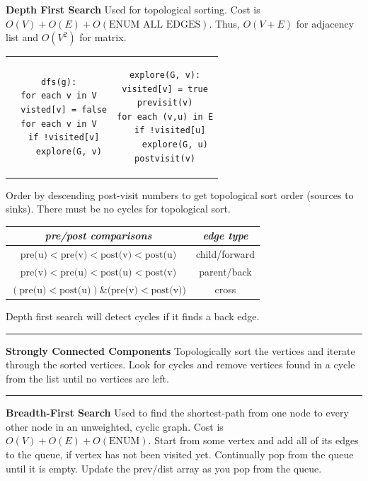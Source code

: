 \documentclass[9pt]{amsart}
\begin{document}
\begin{multicols*}{3}
  \textbf{Depth First Search}
  \newline
  Used for topological sorting. Cost is $O(V) + O(E) + O(\text{ENUM ALL EDGES})$. 
  \newline
  Thus, $O(V + E)$ for adjacency list and $O(V^2)$ for matrix.
  \begin{center}
  \begin{tabular}{c | c}
  \begin{lstlisting}
dfs(g):
for each v in V
  visted[v] = false
for each v in V
  if !visited[v]
    explore(G, v)
  \end{lstlisting}
  &
  \begin{lstlisting}
explore(G, v):
visited[v] = true
previsit(v)
for each (v,u) in E
  if !visited[u]
    explore(G, u)
postvisit(v)
  \end{lstlisting}
  \end{tabular}
  \end{center}
  Order by descending post-visit numbers to get topological sort order (sources to sinks).
  There must be no cycles for topological sort.
  \footnotesize
  \begin{center}
  \begin{tabular}{c | c}
     \emph{pre/post comparisons} & \emph{edge type} \\
     \hline
     $\text{pre(u)} < \text{pre(v)} < \text{post(v)} < \text{post(u)}$ & child/forward \\
     \hline
     $\text{pre(v)} < \text{pre(u)} < \text{post(u)} < \text{post(v)}$ & parent/back \\
     \hline
     $(\text{pre(u)} < \text{post(u)}) \text{\&} (\text{pre(v)} < \text{post(v))}$ & cross \\
  \end{tabular}
  \end{center}
  \normalsize
  Depth first search will detect cycles if it finds a back edge.

  \vskip 7pt
  \hrule
  \vskip 7pt

  \textbf{Strongly Connected Components}
  \newline
  Topologically sort the vertices and iterate 
  through the sorted vertices. Look for cycles and remove vertices found in a cycle from 
  the list until no vertices are left.

  \vskip 7pt
  \hrule
  \vskip 7pt

  \textbf{Breadth-First Search} 
  \newline
  Used to find the shortest-path from one node to every other node in an unweighted, cyclic
  graph. Cost is $O(V) + O(E) + O(\text{ENUM})$. 
  \vskip 5pt
  Start from some vertex and add all of its edges to the queue, if vertex has not been
  visited yet. Continually pop from the 
  queue until it is empty. Update the prev/dist array as you pop from the queue.


\end{multicols*}
\end{document}

